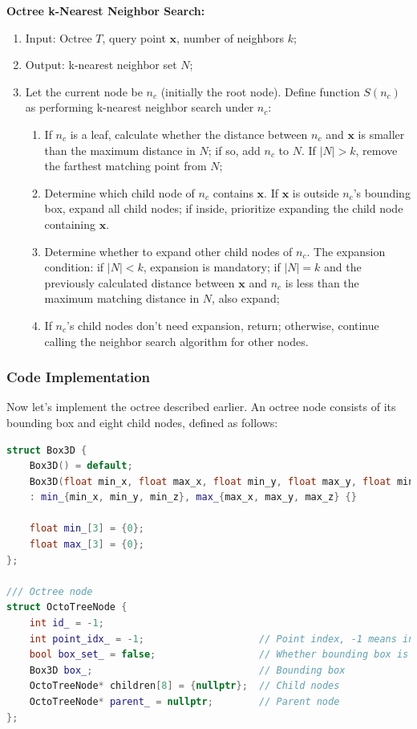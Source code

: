 \begin{mdframed}
	\textbf{Octree k-Nearest Neighbor Search:}
	\begin{enumerate}
		\item Input: Octree $T$, query point $\mathbf{x}$, number of neighbors $k$;
		\item Output: k-nearest neighbor set $N$;
		\item Let the current node be $n_c$ (initially the root node). Define function $S(n_c)$ as performing k-nearest neighbor search under $n_c$:
		\begin{enumerate}
			\item If $n_c$ is a leaf, calculate whether the distance between $n_c$ and $\mathbf{x}$ is smaller than the maximum distance in $N$; if so, add $n_c$ to $N$. If $|N| > k$, remove the farthest matching point from $N$;
			\item Determine which child node of $n_c$ contains $\mathbf{x}$. If $\mathbf{x}$ is outside $n_c$'s bounding box, expand all child nodes; if inside, prioritize expanding the child node containing $\mathbf{x}$.
			\item Determine whether to expand other child nodes of $n_c$. The expansion condition: if $|N|<k$, expansion is mandatory; if $|N|=k$ and the previously calculated distance between $\mathbf{x}$ and $n_c$ is less than the maximum matching distance in $N$, also expand;
			\item If $n_c$'s child nodes don't need expansion, return; otherwise, continue calling the neighbor search algorithm for other nodes.
		\end{enumerate}
	\end{enumerate}
\end{mdframed}

\subsubsection{Code Implementation}  
Now let's implement the octree described earlier. An octree node consists of its bounding box and eight child nodes, defined as follows:

\begin{lstlisting}[language=c++,caption=src/ch5/octo\_tree.h]
struct Box3D {
	Box3D() = default;
	Box3D(float min_x, float max_x, float min_y, float max_y, float min_z, float max_z)
	: min_{min_x, min_y, min_z}, max_{max_x, max_y, max_z} {}
	
	float min_[3] = {0};
	float max_[3] = {0};
};

/// Octree node
struct OctoTreeNode {
	int id_ = -1;
	int point_idx_ = -1;                    // Point index, -1 means invalid
	bool box_set_ = false;                  // Whether bounding box is set
	Box3D box_;                             // Bounding box
	OctoTreeNode* children[8] = {nullptr};  // Child nodes
	OctoTreeNode* parent_ = nullptr;        // Parent node
};
\end{lstlisting}

